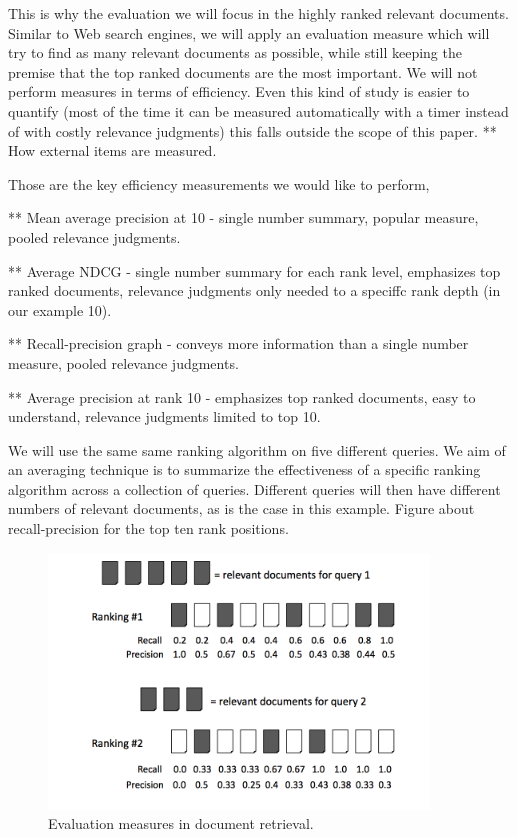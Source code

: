 \documentclass{llncs}
\begin{document}
This is why  the evaluation we will focus in the highly ranked relevant documents. Similar to Web search engines, we will apply an evaluation measure which will try to find as many relevant documents as possible, while still keeping the  premise that the top ranked documents are the most important. We will not perform measures in terms of efficiency. Even this kind of study is easier to quantify (most of the time it can be measured automatically with a timer instead of with costly relevance judgments) this falls outside the scope of this paper.
** How external items are measured.

Those are the key efficiency measurements we would like to perform,

** Mean average precision at 10  - single number summary, popular measure, pooled
relevance judgments.

** Average NDCG - single number summary for each rank level, emphasizes top ranked documents, relevance judgments only needed to a speciffc rank depth
(in our example 10).

** Recall-precision graph - conveys more information than a single number measure, pooled relevance judgments.

** Average precision at rank 10 - emphasizes top ranked documents, easy to understand, relevance judgments limited to top 10.

We will use the same same ranking algorithm on five different queries. We aim of an averaging technique is to summarize the effectiveness of a specific ranking algorithm across a collection of queries. Different queries will then have different numbers of relevant documents, as is the case in this example. Figure about recall-precision for the top ten rank positions.

\begin{figure}[h!]
\centering
\includegraphics[width=0.9\textwidth]{figure/cumulativeGain}
\caption{Evaluation measures in document retrieval.}
\label{fig:namedCumulativeGain}%
\end{figure}
\end{document}
